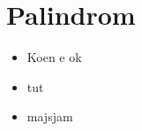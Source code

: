 \documentclass[leqno]{report}
\begin{document}

\newpage



\newpage

\tableofcontents

\newpage


















\chapter{Palindrom}
\begin{itemize}
    \item Koen e ok
    \item tut
    \item majsjam
\end{itemize}

\clearpage
{}
{} %




\appendix

\newpage


\end{document}
